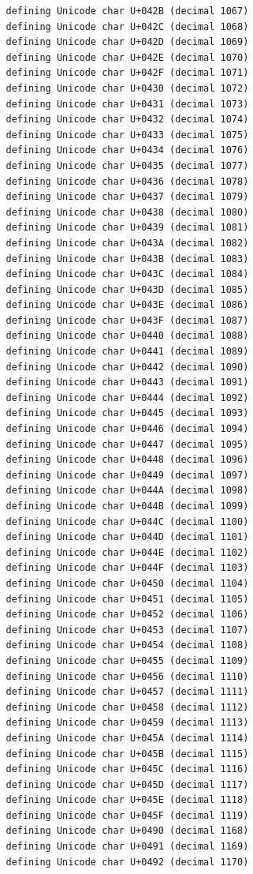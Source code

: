 \documentclass{article}
\begin{document}
\begin{verbatim}
   defining Unicode char U+042B (decimal 1067)
   defining Unicode char U+042C (decimal 1068)
   defining Unicode char U+042D (decimal 1069)
   defining Unicode char U+042E (decimal 1070)
   defining Unicode char U+042F (decimal 1071)
   defining Unicode char U+0430 (decimal 1072)
   defining Unicode char U+0431 (decimal 1073)
   defining Unicode char U+0432 (decimal 1074)
   defining Unicode char U+0433 (decimal 1075)
   defining Unicode char U+0434 (decimal 1076)
   defining Unicode char U+0435 (decimal 1077)
   defining Unicode char U+0436 (decimal 1078)
   defining Unicode char U+0437 (decimal 1079)
   defining Unicode char U+0438 (decimal 1080)
   defining Unicode char U+0439 (decimal 1081)
   defining Unicode char U+043A (decimal 1082)
   defining Unicode char U+043B (decimal 1083)
   defining Unicode char U+043C (decimal 1084)
   defining Unicode char U+043D (decimal 1085)
   defining Unicode char U+043E (decimal 1086)
   defining Unicode char U+043F (decimal 1087)
   defining Unicode char U+0440 (decimal 1088)
   defining Unicode char U+0441 (decimal 1089)
   defining Unicode char U+0442 (decimal 1090)
   defining Unicode char U+0443 (decimal 1091)
   defining Unicode char U+0444 (decimal 1092)
   defining Unicode char U+0445 (decimal 1093)
   defining Unicode char U+0446 (decimal 1094)
   defining Unicode char U+0447 (decimal 1095)
   defining Unicode char U+0448 (decimal 1096)
   defining Unicode char U+0449 (decimal 1097)
   defining Unicode char U+044A (decimal 1098)
   defining Unicode char U+044B (decimal 1099)
   defining Unicode char U+044C (decimal 1100)
   defining Unicode char U+044D (decimal 1101)
   defining Unicode char U+044E (decimal 1102)
   defining Unicode char U+044F (decimal 1103)
   defining Unicode char U+0450 (decimal 1104)
   defining Unicode char U+0451 (decimal 1105)
   defining Unicode char U+0452 (decimal 1106)
   defining Unicode char U+0453 (decimal 1107)
   defining Unicode char U+0454 (decimal 1108)
   defining Unicode char U+0455 (decimal 1109)
   defining Unicode char U+0456 (decimal 1110)
   defining Unicode char U+0457 (decimal 1111)
   defining Unicode char U+0458 (decimal 1112)
   defining Unicode char U+0459 (decimal 1113)
   defining Unicode char U+045A (decimal 1114)
   defining Unicode char U+045B (decimal 1115)
   defining Unicode char U+045C (decimal 1116)
   defining Unicode char U+045D (decimal 1117)
   defining Unicode char U+045E (decimal 1118)
   defining Unicode char U+045F (decimal 1119)
   defining Unicode char U+0490 (decimal 1168)
   defining Unicode char U+0491 (decimal 1169)
   defining Unicode char U+0492 (decimal 1170)

\end{verbatim}
\end{document}
